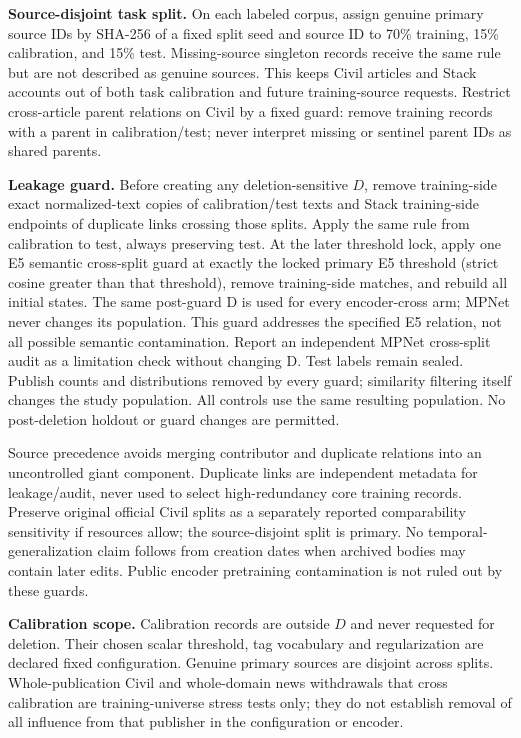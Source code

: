 \documentclass[11pt,a4paper]{article}
\begin{document}
\textbf{Source-disjoint task split.} On each labeled corpus, assign genuine primary source IDs by SHA-256 of a fixed split seed and source ID to 70\% training, 15\% calibration, and 15\% test. Missing-source singleton records receive the same rule but are not described as genuine sources. This keeps Civil articles and Stack accounts out of both task calibration and future training-source requests. Restrict cross-article parent relations on Civil by a fixed guard: remove training records with a parent in calibration/test; never interpret missing or sentinel parent IDs as shared parents.

\textbf{Leakage guard.} Before creating any deletion-sensitive $D$, remove training-side exact normalized-text copies of calibration/test texts and Stack training-side endpoints of duplicate links crossing those splits. Apply the same rule from calibration to test, always preserving test. At the later threshold lock, apply one E5 semantic cross-split guard at exactly the locked primary E5 threshold (strict cosine greater than that threshold), remove training-side matches, and rebuild all initial states. The same post-guard D is used for every encoder-cross arm; MPNet never changes its population. This guard addresses the specified E5 relation, not all possible semantic contamination. Report an independent MPNet cross-split audit as a limitation check without changing D. Test labels remain sealed. Publish counts and distributions removed by every guard; similarity filtering itself changes the study population. All controls use the same resulting population. No post-deletion holdout or guard changes are permitted.

Source precedence avoids merging contributor and duplicate relations into an uncontrolled giant component. Duplicate links are independent metadata for leakage/audit, never used to select high-redundancy core training records. Preserve original official Civil splits as a separately reported comparability sensitivity if resources allow; the source-disjoint split is primary. No temporal-generalization claim follows from creation dates when archived bodies may contain later edits. Public encoder pretraining contamination is not ruled out by these guards.

\textbf{Calibration scope.} Calibration records are outside $D$ and never requested for deletion. Their chosen scalar threshold, tag vocabulary and regularization are declared fixed configuration. Genuine primary sources are disjoint across splits. Whole-publication Civil and whole-domain news withdrawals that cross calibration are training-universe stress tests only; they do not establish removal of all influence from that publisher in the configuration or encoder.
\end{document}
